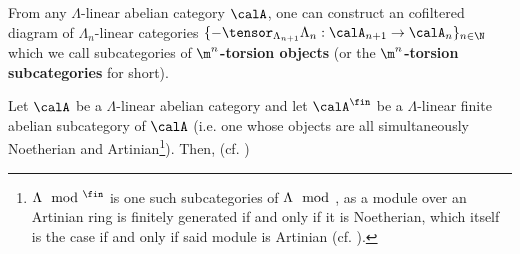         \begin{definition} \label{def: torsion_objects_and_adic_objects}
            From any $\Lambda$-linear abelian category $\calA$, one can construct an cofiltered diagram of $\Lambda_n$-linear categories $\{- \tensor_{\Lambda_{n + 1}} \Lambda_n: \calA_{n + 1} \to \calA_n\}_{n \in \N}$ which we call subcategories of \textbf{$\m^n$-torsion objects} (or the \textbf{$\m^n$-torsion subcategories} for short).
        \end{definition}
        \begin{proposition} \label{prop: artin_rees_categories_of_adic_projective_systems}
            Let $\calA$ be a $\Lambda$-linear abelian category and let $\calA^{\fin}$ be a $\Lambda$-linear finite abelian subcategory of $\calA$ (i.e. one whose objects are all simultaneously Noetherian and Artinian\footnote{$\Lambda\mod^{\fin}$ is one such subcategories of $\Lambda\mod$, as a module over an Artinian ring is finitely generated if and only if it is Noetherian, which itself is the case if and only if said module is Artinian (cf. \cite[Theorem 4.15]{lam_first_course_in_noncommutative_rings}).}). Then, (cf. \cite[Proposition 2.2.4]{behrend_l_adic_sheaves_for_algebraic_stacks})
        \end{proposition}
        
